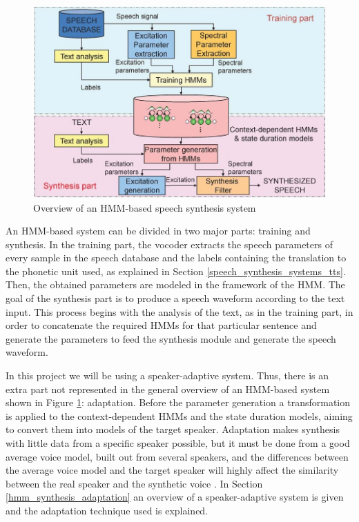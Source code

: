 \begin{figure}[!htb]
\begin{centering}
\includegraphics[width=\textwidth]{images/hmm_based_system_overview.jpg}
\caption{Overview of an HMM-based speech synthesis system \cite{tokuda13}}
\label{fig:hmm_system_overview}
\end{centering}
\end{figure}

An HMM-based system can be divided in two major parts: training and synthesis. 
%
In the training part, the vocoder extracts the speech parameters of every sample in the speech database and the labels containing the translation to the phonetic unit used, as explained in Section \ref{speech_synthesis_systems_tts}.
%
Then, the obtained parameters are modeled in the framework of the HMM.
%
The goal of the synthesis part is to produce a speech waveform according to the text input.
%
This process begins with the analysis of the text, as in the training part, in order to concatenate the required HMMs for that particular sentence and generate the parameters to feed the synthesis module and generate the speech waveform.

In this project we will be using a speaker-adaptive system. 
%
Thus, there is an extra part not represented in the general overview of an HMM-based system shown in Figure \ref{fig:hmm_system_overview}: adaptation. 
%
Before the parameter generation a transformation is applied to the context-dependent HMMs and the state duration models, aiming to convert them into models of the target speaker.
%
Adaptation makes synthesis with little data from a specific speaker possible, but it must be done from a good average voice model, built out from several speakers, and the differences between the average voice model and the target speaker will highly affect the similarity between the real speaker and the synthetic voice \cite{yamagishi2010roles}.
%
In Section \ref{hmm_synthesis_adaptation} an overview of a speaker-adaptive system is given and the adaptation technique used is explained.

